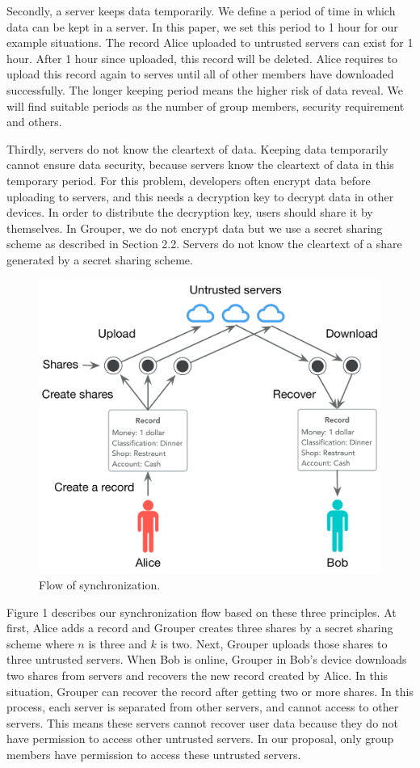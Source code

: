 \documentclass[twocolumn,10pt]{article}
\begin{document}
Secondly, a server keeps data temporarily. We define a period of time in which data can be kept in a server. In this paper, we set this period to 1 hour for our example situations. The record Alice uploaded to untrusted servers can exist for 1 hour. After 1 hour since uploaded, this record will be deleted. Alice requires to upload this record again to serves until all of other members have downloaded successfully. The longer keeping period means the higher risk of data reveal. We will find suitable periods as the number of group members, security requirement and others. 

Thirdly, servers do not know the cleartext of data. Keeping data temporarily cannot ensure data security, because servers know the cleartext of data in this temporary period. For this problem, developers often encrypt data before uploading to servers, and this needs a decryption key to decrypt data in other devices. In order to distribute the decryption key, users should share it by themselves. In Grouper, we do not encrypt data but we use a secret sharing scheme as described in Section 2.2. Servers do not know the cleartext of a share generated by a secret sharing scheme.

\begin{figure}[t]
\centering
\includegraphics[scale=0.38]{sync_flow}
\caption{Flow of synchronization.}
\end{figure}

Figure 1 describes our synchronization flow based on these three principles. At first, Alice adds a record and Grouper creates three shares by a secret sharing scheme where $n$ is three and $k$ is two. Next, Grouper uploads those shares to three untrusted servers. When Bob is online, Grouper in Bob's device downloads two shares from servers and recovers the new record created by Alice. In this situation, Grouper can recover the record after getting two or more shares. In this process, each server is separated from other servers, and cannot access to other servers. This means these servers cannot recover user data because they do not have permission to access other untrusted servers. In our proposal, only group members have permission to access these untrusted servers.
\end{document}
